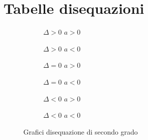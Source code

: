 \chapter{Tabelle disequazioni}
\label{cha:TabelleDisisequazionia}
\minitoc
\mtcskip                                %
\minilof                                %
\mtcskip                                %
\minilot
\begin{sidewaysfigure}
	\begin{subfigure}[b]{.5\linewidth}
		\centering

		\caption{$\Delta>0$ $a>0$}\label{graf:dis2GDeltaMagZa2xa}
	\end{subfigure}%
	\begin{subfigure}[b]{.5\linewidth}
		\centering
	
		\caption{$\Delta>0$ $a<0$}\label{graf:dis2GDeltaMagZb2xa}
	\end{subfigure}
	\begin{subfigure}[b]{.5\linewidth}
		\centering
		
		\caption{$\Delta=0$ $a>0$}\label{graf:dis2GDeltaUguaZa2xa}
			\end{subfigure}%
	\begin{subfigure}[b]{.5\linewidth}
		\centering
		
		\caption{$\Delta=0$ $a<0$}\label{graf:dis2GDeltaUguaZb2xa}
	\end{subfigure}
\begin{subfigure}[b]{.5\linewidth}
	\centering
		
	\caption{$\Delta<0$ $a>0$}\label{graf:dis2GDeltaMinorZa2xa}
\end{subfigure}%
\begin{subfigure}[b]{.5\linewidth}
	\centering

	\caption{$\Delta<0$ $a<0$}\label{graf:dis2GDeltaMinorZb2xa}
\end{subfigure}
	\caption{Grafici disequazione di secondo grado}
\end{sidewaysfigure}
